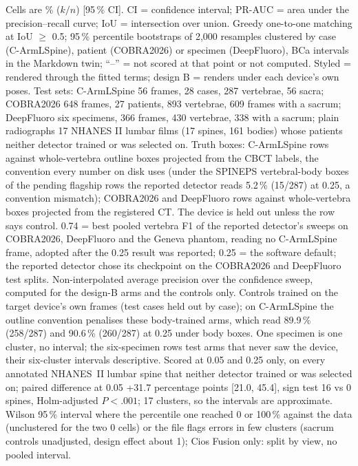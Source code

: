 \begin{table}[p]
{\begin{minipage}{23.2cm}
Cells are \% ($k/n$) [95\,\% CI]. CI = confidence interval; PR-AUC = area under the precision--recall curve; IoU = intersection over union. Greedy one-to-one matching at IoU $\ge$ 0.5; 95\,\% percentile bootstraps of 2,000 resamples clustered by case (C-ArmLSpine), patient (COBRA2026) or specimen (DeepFluoro), BCa intervals in the Markdown twin; ``--'' = not scored at that point or not computed. Styled = rendered through the fitted terms; design B = renders under each device's own poses.
Test sets: C-ArmLSpine 56 frames, 28 cases, 287 vertebrae, 56 sacra; COBRA2026 648 frames, 27 patients, 893 vertebrae, 609 frames with a sacrum; DeepFluoro six specimens, 366 frames, 430 vertebrae, 338 with a sacrum; plain radiographs 17 NHANES II lumbar films (17 spines, 161 bodies) whose patients neither detector trained or was selected on. Truth boxes: C-ArmLSpine rows against whole-vertebra outline boxes projected from the CBCT labels, the convention every number on disk uses (under the SPINEPS vertebral-body boxes of the pending flagship rows the reported detector reads 5.2\,\% (15/287) at 0.25, a convention mismatch); COBRA2026 and DeepFluoro rows against whole-vertebra boxes projected from the registered CT. The device is held out unless the row says control.
0.74 = best pooled vertebra F1 of the reported detector's sweeps on COBRA2026, DeepFluoro and the Geneva phantom, reading no C-ArmLSpine frame, adopted after the 0.25 result was reported; 0.25 = the software default; the reported detector chose its checkpoint on the COBRA2026 and DeepFluoro test splits.
Non-interpolated average precision over the confidence sweep, computed for the design-B arms and the controls only.
Controls trained on the target device's own frames (test cases held out by case); on C-ArmLSpine the outline convention penalises these body-trained arms, which read 89.9\,\% (258/287) and 90.6\,\% (260/287) at 0.25 under body boxes.
One specimen is one cluster, no interval; the six-specimen rows test arms that never saw the device, their six-cluster intervals descriptive.
Scored at 0.05 and 0.25 only, on every annotated NHANES~II lumbar spine that neither detector trained or was selected on; paired difference at 0.05 +31.7 percentage points [21.0, 45.4], sign test 16 vs 0 spines, Holm-adjusted $P<.001$; 17 clusters, so the intervals are approximate.
Wilson 95\,\% interval where the percentile one reached 0 or 100\,\% against the data (unclustered for the two 0 cells) or the file flags errors in few clusters (sacrum controls unadjusted, design effect about 1); Cios Fusion only: split by view, no pooled interval.
\par\endgroup
\end{minipage}}
\endgroup
\end{table}
